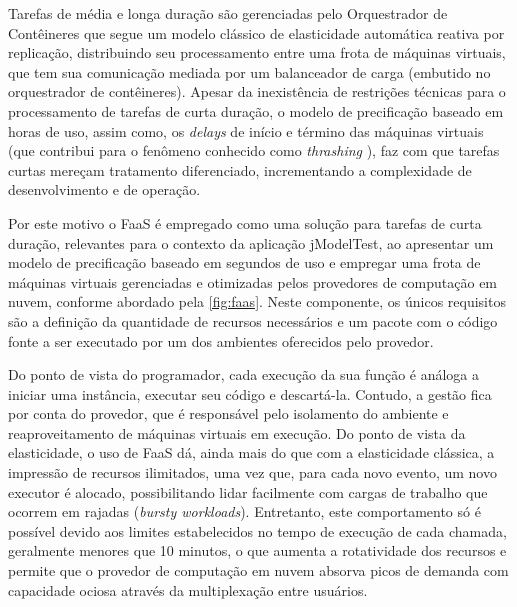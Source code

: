 \documentclass[english,brazilian]{UNISINOSmonografia} %
\begin{document}
Tarefas de média e longa duração são gerenciadas pelo Orquestrador de Contêineres que segue um modelo clássico de elasticidade automática reativa por replicação, distribuindo seu processamento entre uma frota de máquinas virtuais, que tem sua comunicação mediada por um balanceador de carga (embutido no orquestrador de contêineres).
Apesar da inexistência de restrições técnicas para o processamento de tarefas de curta duração, o modelo de precificação baseado em horas de uso, assim como, os \textit{delays} de início e término das máquinas virtuais (que contribui para o fenômeno conhecido como \textit{thrashing} \cite{Bersani2014}), faz com que tarefas curtas mereçam tratamento diferenciado, incrementando a complexidade de desenvolvimento e de operação.


Por este motivo o FaaS é empregado como uma solução para tarefas de curta duração, relevantes para o contexto da aplicação jModelTest, ao apresentar um modelo de precificação baseado em segundos de uso e empregar uma frota de máquinas virtuais gerenciadas e otimizadas pelos provedores de computação em nuvem, conforme abordado pela \autoref{fig:faas}.
Neste componente, os únicos requisitos são a definição da quantidade de recursos necessários e um pacote com o código fonte a ser executado por um dos ambientes oferecidos pelo provedor.


Do ponto de vista do programador, cada execução da sua função é análoga a iniciar uma instância, executar seu código e descartá-la.
Contudo, a gestão fica por conta do provedor, que é responsável pelo isolamento do ambiente e reaproveitamento de máquinas virtuais em execução.
Do ponto de vista da elasticidade, o uso de FaaS dá, ainda mais do que com a elasticidade clássica, a impressão de recursos ilimitados, uma vez que, para cada novo evento, um novo executor é alocado, possibilitando lidar facilmente com cargas de trabalho que ocorrem em rajadas (\textit{bursty workloads}).
Entretanto, este comportamento só é possível devido aos limites estabelecidos no tempo de execução de cada chamada, geralmente menores que 10 minutos, o que aumenta a rotatividade dos recursos e permite que o provedor de computação em nuvem absorva picos de demanda com capacidade ociosa através da multiplexação entre usuários.
\end{document}
